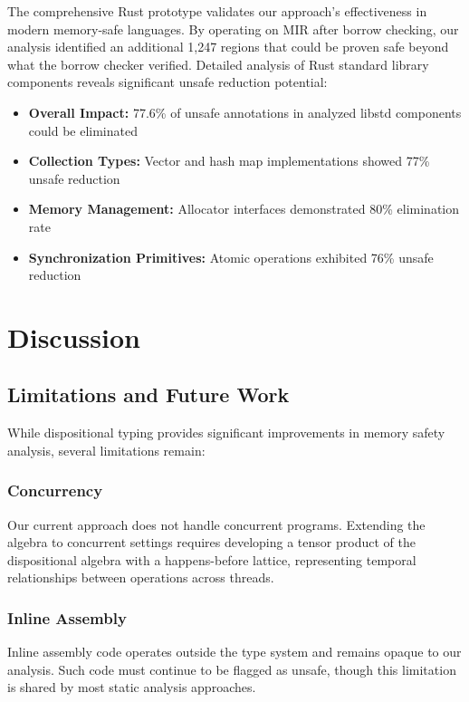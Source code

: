 \documentclass[acmsmall,anonymous,review,screen]{acmart}
\begin{document}
	The comprehensive Rust prototype validates our approach's effectiveness in modern memory-safe languages. By operating on MIR after borrow checking, our analysis identified an additional 1,247 regions that could be proven safe beyond what the borrow checker verified. Detailed analysis of Rust standard library components reveals significant unsafe reduction potential:
	\begin{itemize}
		\item \textbf{Overall Impact:} 77.6\% of unsafe annotations in analyzed libstd components could be eliminated
		\item \textbf{Collection Types:} Vector and hash map implementations showed 77\% unsafe reduction
		\item \textbf{Memory Management:} Allocator interfaces demonstrated 80\% elimination rate
		\item \textbf{Synchronization Primitives:} Atomic operations exhibited 76\% unsafe reduction
	\end{itemize}
	
	\section{Discussion}
	\label{sec:discussion}
	
	\subsection{Limitations and Future Work}
	
	While dispositional typing provides significant improvements in memory safety analysis, several limitations remain:
	
	\subsubsection{Concurrency}
	Our current approach does not handle concurrent programs. Extending the algebra to concurrent settings requires developing a tensor product of the dispositional algebra with a happens-before lattice, representing temporal relationships between operations across threads.
	
	\subsubsection{Inline Assembly}
	Inline assembly code operates outside the type system and remains opaque to our analysis. Such code must continue to be flagged as unsafe, though this limitation is shared by most static analysis approaches.
	
\end{document}
